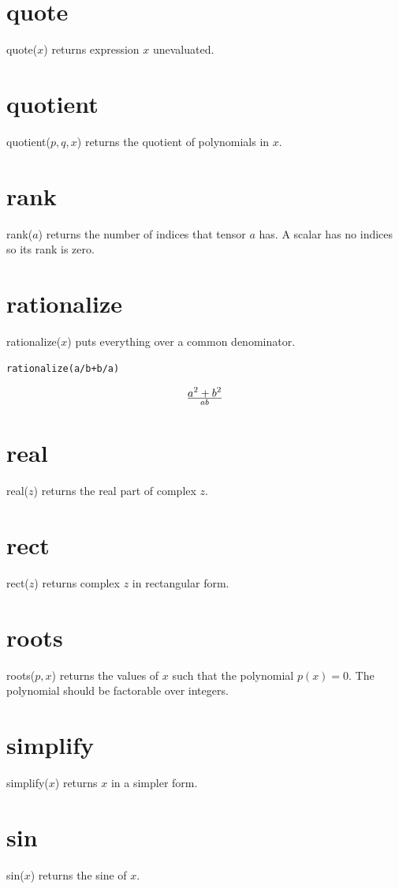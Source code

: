 \documentclass[12pt]{book}
\begin{document}
\section*{quote}
quote($x$) returns expression $x$ unevaluated.

\section*{quotient}
quotient($p,q,x$) returns the quotient of polynomials in $x$.

\section*{rank}
rank($a$) returns the number of indices that tensor $a$ has.
A scalar has no indices so its rank is zero.

\section*{rationalize}
rationalize($x$) puts everything over a common denominator.

\medskip
{\tt rationalize(a/b+b/a)}

$$a^2+b^2\over ab$$

\section*{real}
real($z$) returns the real part of complex $z$.

\section*{rect}
rect($z$) returns complex $z$ in rectangular form.

\section*{roots}
roots($p,x$) returns the values of $x$ such that the polynomial $p(x)=0$.
The polynomial should be factorable over integers.

\section*{simplify}
simplify($x$) returns $x$ in a simpler form.

\section*{sin}
sin($x$) returns the sine of $x$.
\end{document}
